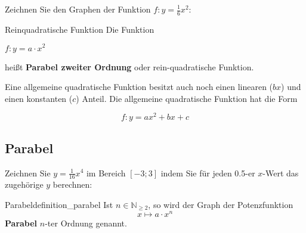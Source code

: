 Zeichnen Sie den Graphen der Funktion $f: y= \frac16 x^2$:


\begin{definition}{Reinquadratische Funktion}{}
Die Funktion

$f: y = a\cdot{}x^2$

heißt \textbf{Parabel zweiter Ordnung} oder rein-quadratische Funktion.
\end{definition}


\begin{bemerkung}{}{}
Eine allgemeine quadratische Funktion besitzt auch noch einen linearen ($bx$) und einen konstanten ($c$) Anteil. Die allgemeine quadratische Funktion hat die Form

$$f: y= ax^2 + bx + c$$
\end{bemerkung}



\newpage

\subsection{Parabel}

Zeichnen Sie $y = \frac{1}{16}x^4$ im Bereich $[-3; 3]$ indem Sie für jeden 0.5-er $x$-Wert das zugehörige $y$ berechnen:



\begin{definition}{Parabel}{definition_parabel}
  Ist $n\in \mathbb{N}_{\ge 2}$, so wird der Graph der Potenzfunktion
  $$x\mapsto a\cdot{}x^n$$
  \textbf{Parabel} $n$-ter Ordnung genannt.
\end{definition}



